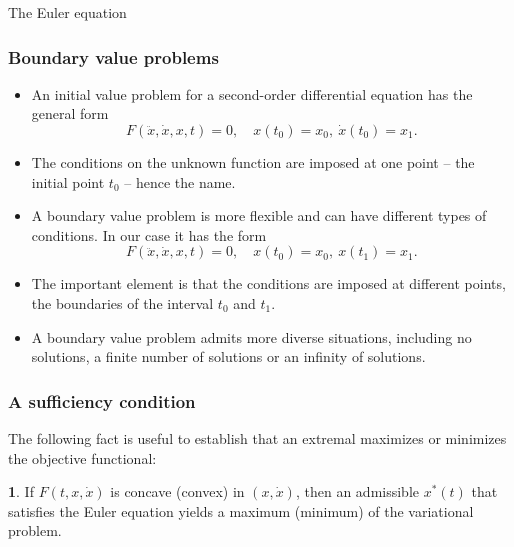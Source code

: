 \documentclass[10pt]{beamer}
\theoremstyle{definition}
\newtheorem{Fact}{\translate{Fact}}
\begin{document}
\begin{section}{The Euler equation}
\begin{frame}[fragile]
\frametitle{Boundary value problems}
\begin{itemize}
\item An initial value problem for a second-order differential equation has the general form
\[ F(\ddot{x},\dot{x},x,t)=0, \quad x(t_0)=x_0,~\dot{x}(t_0)=x_1.  \]
\item The conditions on the unknown function are imposed at one point -- the initial point $ t_0 $ -- hence the name.
\item A boundary value problem is more flexible and can have different types of conditions. In our case it has the form 
\[ F(\ddot{x},\dot{x},x,t)=0, \quad x(t_0)=x_0,~x(t_1)=x_1.  \]
\item The important element is that the conditions are imposed at different points, the boundaries of the interval $ t_0 $ and $ t_1 $.
\item A boundary value problem admits more diverse situations, including no solutions, a finite number of solutions or an infinity of solutions.
\end{itemize}
\end{frame}

\begin{frame}[fragile]
\frametitle{A sufficiency condition}
The following fact is useful to establish that an extremal maximizes or minimizes the objective functional:
\begin{Fact}
If $ F(t,x,\dot{x}) $ is concave (convex) in $ (x,\dot{x}) $, then an admissible $ x^*(t) $ that satisfies the Euler equation yields a maximum (minimum) of the variational problem.
\label{fc:SCs}
\end{Fact}
\end{frame}

\end{section}
\end{document}

